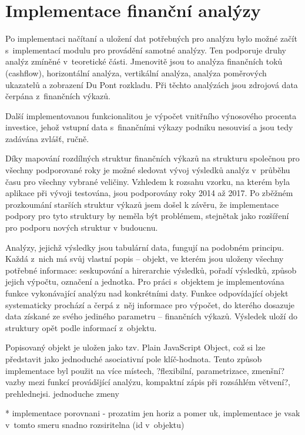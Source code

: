 \section{Implementace finanční analýzy}
Po implementaci načítaní a uložení dat potřebných pro analýzu bylo možné začít s~implementací modulu pro provádění samotné analýzy. Ten podporuje druhy analýz zmíněné v~teoretické části. Jmenovitě jsou to analýza finančních toků (cashflow), horizontální analýza, vertikální analýza, analýza poměrových ukazatelů a zobrazení Du Pont rozkladu. Při těchto analýzách jsou zdrojová data čerpána z~finančních výkazů. 

Další implementovanou funkcionalitou je výpočet vnitřního výnosového procenta investice, jehož vstupní data s~finančními výkazy podniku nesouvisí a jsou tedy zadávána zvlášť, ručně.

Díky mapování rozdílných struktur finančních výkazů na strukturu společnou pro všechny podporované roky je možné sledovat vývoj výsledků analýz v~průběhu času pro všechny vybrané veličiny. Vzhledem k rozsahu vzorku, na kterém byla aplikace při vývoji testována, jsou podporovány roky 2014 až 2017. Po zběžném prozkoumání starších struktur výkazů jsem došel k závěru, že implementace podpory pro tyto struktury by neměla být problémem, stejnětak jako rozšíření pro podporu nových struktur v budoucnu.

Analýzy, jejichž výsledky jsou tabulární data, fungují na podobném principu. Každá z~nich má svůj vlastní popis -- objekt, ve kterém jsou uloženy všechny potřebné informace: seskupování a hirerarchie výsledků, pořadí výsledků, způsob jejich výpočtu, označení a jednotka. Pro práci s~objektem je implementována funkce vykonávající analýzu nad konkrétními daty. Funkce odpovídající objekt systematicky prochází a čerpá z~něj informace pro výpočet, do kterého dosazuje data získané ze svého jediného parametru -- finančních výkazů. Výsledek uloží do struktury opět podle informací z~objektu.

Popisovaný objekt je uložen jako tzv. Plain JavaScript Object, což si lze představit jako jednoduché asociativní pole klíč-hodnota. Tento způsob implementace byl použit na více místech, ?flexibilní, parametrizace, zmenšní? vazby mezi funkcí provádšjící analýzu, kompaktní zápis při rozsáhlém větvení?, prehlednejsi. jednoduche zmeny

* implementace porovnani - prozatim jen horiz a pomer uk, implementace je vsak v~tomto smeru snadno rozsiritelna (id v~objektu)

